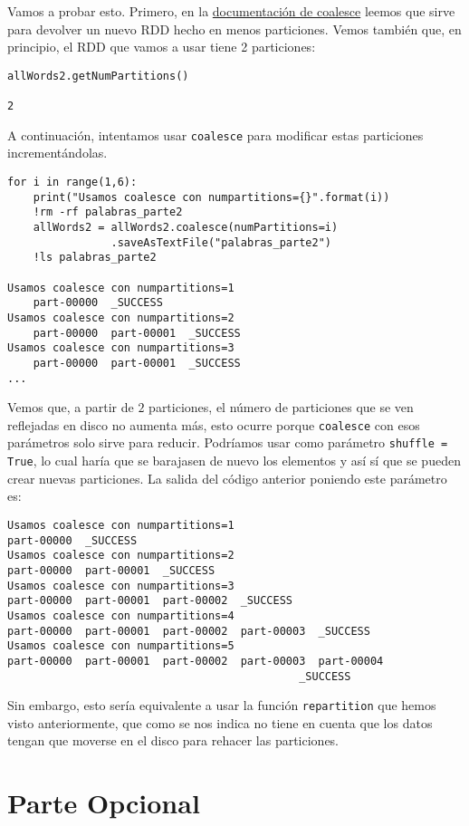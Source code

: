 \documentclass[11pt]{article}
\def\inline{\lstinline[basicstyle=\ttfamily,keywordstyle={}]}
\begin{document}
Vamos a probar esto. Primero, en la \href{https://spark.apache.org/docs/latest/api/python/reference/api/pyspark.RDD.coalesce.html}{documentación de coalesce} leemos que sirve para devolver un nuevo RDD hecho en menos particiones. Vemos también que, en principio, el RDD que vamos a usar tiene 2 particiones:

\begin{verbatim}
allWords2.getNumPartitions()

2
\end{verbatim}

A continuación, intentamos usar \inline{coalesce} para modificar estas particiones incrementándolas.
\begin{verbatim}
for i in range(1,6):
    print("Usamos coalesce con numpartitions={}".format(i))
    !rm -rf palabras_parte2
    allWords2 = allWords2.coalesce(numPartitions=i)
                .saveAsTextFile("palabras_parte2")
    !ls palabras_parte2

Usamos coalesce con numpartitions=1
    part-00000  _SUCCESS
Usamos coalesce con numpartitions=2
    part-00000  part-00001	_SUCCESS
Usamos coalesce con numpartitions=3
    part-00000  part-00001	_SUCCESS
...
\end{verbatim}
Vemos que, a partir de $2$ particiones, el número de particiones que se ven reflejadas en disco no aumenta más, esto ocurre porque \inline{coalesce} con esos parámetros solo sirve para reducir. Podríamos usar como parámetro \inline{shuffle = True}, lo cual haría que se barajasen de nuevo los elementos y así sí que se pueden crear nuevas particiones. La salida del código anterior poniendo este parámetro es: 
\begin{verbatim}
Usamos coalesce con numpartitions=1
part-00000  _SUCCESS
Usamos coalesce con numpartitions=2
part-00000  part-00001	_SUCCESS
Usamos coalesce con numpartitions=3
part-00000  part-00001	part-00002  _SUCCESS
Usamos coalesce con numpartitions=4
part-00000  part-00001	part-00002  part-00003	_SUCCESS
Usamos coalesce con numpartitions=5
part-00000  part-00001	part-00002  part-00003	part-00004 
                                             _SUCCESS
\end{verbatim}

Sin embargo, esto sería equivalente a usar la función \inline{repartition} que hemos visto anteriormente, que como se nos indica no tiene en cuenta que los datos tengan que moverse en el disco para rehacer las particiones.


\section{Parte Opcional}
\end{document}
